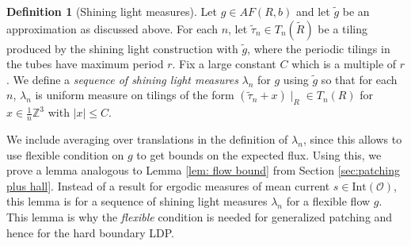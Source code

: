 \documentclass[11pt]{article}
\theoremstyle{remark}
\theoremstyle{definition}
\newtheorem{definition}[thm]{Definition}
\newcommand{\mc}[1]{\mathcal{#1}}
\newcommand{\m}[1]{\mathbb{#1}}
\begin{document}
\begin{definition}[Shining light measures]\label{def:shininglight_measures}
Let $g\in AF(R,b)$ and let $\widetilde g$ be an approximation as discussed above. For each $n$, let $\widetilde \tau_n\in T_n(\widetilde R)$ be a tiling produced by the shining light construction with $\widetilde g$, where the periodic tilings in the tubes have maximum period $r$. Fix a large constant $C$ which is a multiple of $r$. We define a \textit{sequence of shining light measures} $\lambda_n$ for $g$ using $\widetilde g$ so that for each $n$, $\lambda_n$ is uniform measure on tilings of the form $(\widetilde \tau_n + x)\mid_R\in T_n(R)$ for $x\in \frac{1}{n}\m Z^3$ with $|x| \leq C$. 
\end{definition}

We include averaging over translations in the definition of $\lambda_n$, since this allows to use flexible condition on $g$ to get bounds on the expected flux. Using this, we prove a lemma analogous to Lemma \ref{lem: flow bound} from Section \ref{sec:patching plus hall}. Instead of a result for ergodic measures of mean current $s\in \text{Int}(\mc O)$, this lemma is for a sequence of shining light measures $\lambda_n$ for a flexible flow $g$. This lemma is why the \textit{flexible} condition is needed for generalized patching and hence for the hard boundary LDP. 
\end{document}
